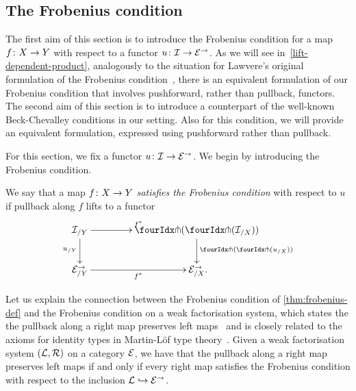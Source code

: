 \documentclass[reqno,10pt,a4paper,oneside,draft]{amsart}
\begin{document}
\subsection*{The Frobenius condition}

The first aim of this section is to introduce the Frobenius condition for a map $f \co X \to Y$ with respect to a functor $u \co \cal{I} \to \catE^\to$.
As we will see in~\cref{lift-dependent-product}, analogously to the situation for Lawvere's original formulation of the Frobenius condition~\cite{lawvere-equality}, there is an equivalent formulation of our Frobenius condition that involves pushforward, rather than pullback, functors.
The second aim of this section is to introduce a counterpart of the well-known Beck-Chevalley conditions in our setting.
Also for this condition, we will provide an equivalent formulation, expressed using pushforward rather than pullback.

For this section, we fix a functor $u \co \cal{I} \to \catE^\to$. We begin by introducing the Frobenius condition.

\begin{definition} \label{thm:frobenius-def}
We say that a map $f \co X \to Y$ \emph{satisfies the Frobenius condition} with respect to $u$ if pullback along $f$ lifts to a functor
\[
\xymatrix@C=1.5cm{
  \cal{I}_{/Y}
  \ar[r]^{f^*}
  \ar[d]_{u_{/Y}}
&
  \liftl{(\liftr{(\cal{I}_{/X})})}
  \ar[d]^{\liftl{(\liftr{(u_{/X})})}}
\\
  \catE_{/Y}^\to \ar[r]_{f^*}
&
  \catE_{/X}^\to
\rlap{.}}
\]
\end{definition}

Let us explain the connection between the Frobenius condition of \cref{thm:frobenius-def} and the Frobenius condition on a weak factorisation system, which states the the pullback along a right map preserves left maps~\cite{garner:types-omega-groupoids,garner:topological-simplicial} and is closely related to the axioms for identity types in Martin-L\"of type theory~\cite{gambino-garner:idtypewfs}.
Given a weak factorisation system $(\cal{L}, \cal{R})$ on a category $\catE$, we have that the pullback along a right map preserves left maps if and only if every right map satisfies the Frobenius condition with respect to the inclusion $\cal{L} \hookrightarrow \catE^\to$.
\end{document}
